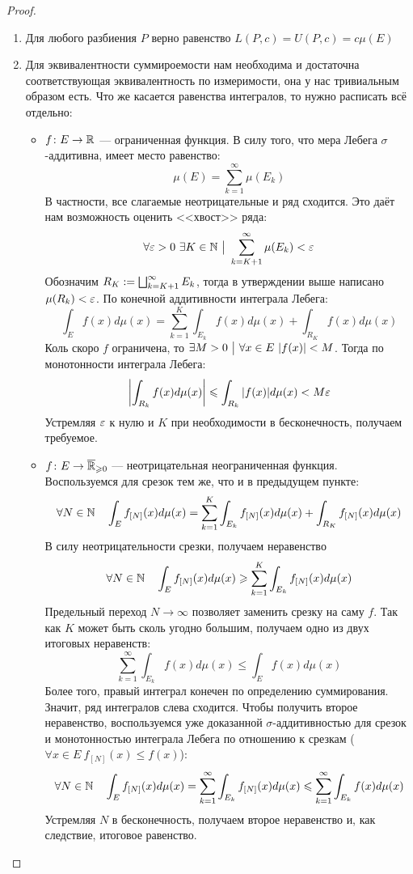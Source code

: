 \begin{proof}~
	\begin{enumerate}
		\item Для любого разбиения $P$ верно равенство $L(P, c) = U(P, c) = c\mu(E)$
		
		\item Для эквивалентности суммироемости нам необходима и достаточна соответствующая эквивалентность по измеримости, она у нас тривиальным образом есть. Что же касается равенства интегралов, то нужно расписать всё отдельно:
		\begin{itemize}
			\item $f \colon E \to \mathbb{R}$ --- ограниченная функция. В силу того, что мера Лебега $\sigma$-аддитивна, имеет место равенство:
			\[
				\mu(E) = \sum_{k = 1}^\infty \mu(E_k)
			\]
			В частности, все слагаемые неотрицательные и ряд сходится. Это даёт нам возможность оценить <<хвост>> ряда:
			\[
				\forall \varepsilon > 0\ \exists K \in \mathbb{N} \ \big|\  \sum_{k = K + 1}^\infty \mu(E_k) < \varepsilon
			\]
			Обозначим $R_K := \bigsqcup_{k = K + 1}^\infty E_k$, тогда в утверждении выше написано $\mu(R_k) < \varepsilon$. По конечной аддитивности интеграла Лебега:
			\[
				\int_E f(x)d\mu(x) = \sum_{k = 1}^K \int_{E_k} f(x)d\mu(x) + \int_{R_K} f(x)d\mu(x)
			\]
			Коль скоро $f$ ограничена, то $\exists M > 0 \ \big|\   \forall x \in E\ |f(x)| < M$. Тогда по монотонности интеграла Лебега:
			\[
				\left|\int_{R_k} f(x)d\mu(x)\right| \leqslant \int_{R_k} |f(x)|d\mu(x) < M\varepsilon
			\]
			Устремляя $\varepsilon$ к нулю и $K$ при необходимости в бесконечность, получаем требуемое. 
			
			\item $f \colon E \to \overline{\mathbb{R}}_{\geqslant 0}$ --- неотрицательная неограниченная функция. Воспользуемся для срезок тем же, что и в предыдущем пункте:
			\[
				\forall N \in \mathbb{N} \quad \int_E f_{[N]}(x)d\mu(x) = \sum_{k = 1}^K \int_{E_k} f_{[N]}(x)d\mu(x) + \int_{R_K} f_{[N]}(x)d\mu(x)
			\]
			В силу неотрицательности срезки, получаем неравенство
			\[
				\forall N \in \mathbb{N} \quad \int_E f_{[N]}(x)d\mu(x) \geqslant \sum_{k = 1}^K \int_{E_k} f_{[N]}(x)d\mu(x)
			\]
			Предельный переход $N \to \infty$ позволяет заменить срезку на саму $f$. Так как $K$ может быть сколь угодно большим, получаем одно из двух итоговых неравенств:
			\[
				\sum_{k = 1}^\infty \int_{E_k} f(x)d\mu(x) \le \int_E f(x)d\mu(x)
			\]
			Более того, правый интеграл конечен по определению суммирования. Значит, ряд интегралов слева сходится. Чтобы получить второе неравенство, воспользуемся уже доказанной $\sigma$-аддитивностью для срезок и монотонностью интеграла Лебега по отношению к срезкам ($\forall x \in E\ f_{[N]}(x) \le f(x)$):
			\[
				\forall N \in \mathbb{N} \quad \int_E f_{[N]}(x)d\mu(x) = \sum_{k = 1}^\infty \int_{E_k} f_{[N]}(x)d\mu(x) \leqslant \sum_{k = 1}^\infty \int_{E_k} f(x)d\mu(x)
			\]
			Устремляя $N$ в бесконечность, получаем второе неравенство и, как следствие, итоговое равенство.
			

\end{itemize}
\end{enumerate}
\end{proof}
